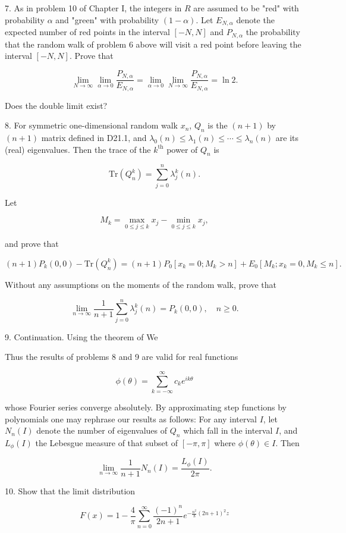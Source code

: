 7. As in problem 10 of Chapter I, the integers in $R$ are assumed to be "red" with probability $\alpha$ and "green" with probability $(1 - \alpha)$. Let $E_{N,\alpha}$ denote the expected number of red points in the interval $[-N,N]$ and $P_{N,\alpha}$ the probability that the random walk of problem 6 above will visit a red point before leaving the interval $[-N,N]$. Prove that

$$\lim_{N \to \infty} \lim_{\alpha \to 0} \frac{P_{N,\alpha}}{E_{N,\alpha}} = \lim_{\alpha \to 0} \lim_{N \to \infty} \frac{P_{N,\alpha}}{E_{N,\alpha}} = \ln 2.$$

Does the double limit exist?

8. For symmetric one-dimensional random walk $x_n$, $Q_n$ is the $(n + 1)$ by $(n + 1)$ matrix defined in D21.1, and $\lambda_0(n) \leq \lambda_1(n) \leq \cdots \leq \lambda_n(n)$ are its (real) eigenvalues. Then the trace of the $k^{\text{th}}$ power of $Q_n$ is

$$\text{Tr} \left( Q_n^k \right) = \sum_{j=0}^{n} \lambda_j^k(n).$$

Let

$$M_k = \max_{0 \leq j \leq k} x_j - \min_{0 \leq j \leq k} x_j,$$

and prove that

$$(n + 1)P_k(0,0) - \text{Tr} \left( Q_n^k \right) = (n + 1)P_0[x_k = 0; M_k > n] + E_0[M_k; x_k = 0, M_k \leq n].$$

Without any assumptions on the moments of the random walk, prove that

$$\lim_{n \to \infty} \frac{1}{n + 1} \sum_{j=0}^{n} \lambda_j^k(n) = P_k(0,0), \quad n \geq 0.$$

9. Continuation. Using the theorem of We

Thus the results of problems 8 and 9 are valid for real functions

$$\phi(\theta) = \sum_{k=-\infty}^{\infty} c_k e^{ik\theta}$$

whose Fourier series converge absolutely. By approximating step functions by polynomials one may rephrase our results as follows: For any interval $I$, let $N_n(I)$ denote the number of eigenvalues of $Q_n$ which fall in the interval $I$, and $L_\phi(I)$ the Lebesgue measure of that subset of $[-\pi, \pi]$ where $\phi(\theta) \in I$. Then

$$\lim_{n \to \infty} \frac{1}{n+1} N_n(I) = \frac{L_\phi(I)}{2\pi}.$$

10. Show that the limit distribution

$$F(x) = 1 - \frac{4}{\pi} \sum_{n=0}^{\infty} \frac{(-1)^n}{2n+1} e^{-\frac{n^2}{8}(2n+1)^2z}$$

